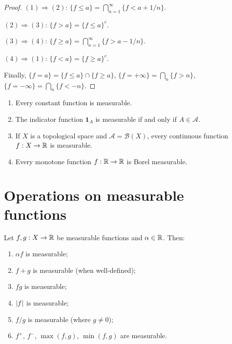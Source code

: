 \begin{proof}
$(1) \Rightarrow (2)$: $\{f \leq a\} = \bigcap_{n=1}^{\infty} \{f < a + 1/n\}$.

$(2) \Rightarrow (3)$: $\{f > a\} = \{f \leq a\}^c$.

$(3) \Rightarrow (4)$: $\{f \geq a\} = \bigcap_{n=1}^{\infty} \{f > a - 1/n\}$.

$(4) \Rightarrow (1)$: $\{f < a\} = \{f \geq a\}^c$.

Finally, $\{f = a\} = \{f \leq a\} \cap \{f \geq a\}$,
$\{f = +\infty\} = \bigcap_n \{f > n\}$, $\{f = -\infty\} = \bigcap_n \{f < -n\}$.
\end{proof}

\begin{example}
\begin{enumerate}
    \item Every constant function is measurable.
    \item The indicator function $\mathbf{1}_A$ is measurable if and only if
    $A \in \mathcal{A}$.
    \item If $X$ is a topological space and $\mathcal{A} = \mathcal{B}(X)$, every
    continuous function $f : X \to \mathbb{R}$ is measurable.
    \item Every monotone function $f : \mathbb{R} \to \mathbb{R}$ is Borel measurable.
\end{enumerate}
\end{example}

\section{Operations on measurable functions}

\begin{theorem}
\label{thm:algebraic_stability}
Let $f, g : X \to \mathbb{R}$ be measurable functions and $\alpha \in \mathbb{R}$. Then:
\begin{enumerate}
    \item $\alpha f$ is measurable;
    \item $f + g$ is measurable (when well-defined);
    \item $fg$ is measurable;
    \item $\left| f \right|$ is measurable;
    \item $f/g$ is measurable (where $g \neq 0$);
    \item $f^+$, $f^-$, $\max(f, g)$, $\min(f, g)$ are measurable.
\end{enumerate}
\end{theorem}

